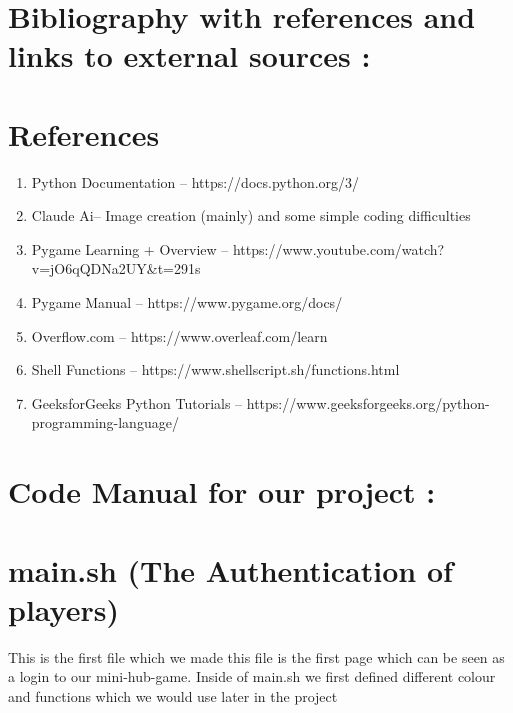 \documentclass{article}
\begin{document}
\section*{Bibliography with references and links to external sources :}
\section*{References}

\begin{enumerate}
    \item Python Documentation -- https://docs.python.org/3/
    \item Claude Ai-- Image creation (mainly) and some simple coding difficulties 
    \item Pygame Learning + Overview -- https://www.youtube.com/watch?v=jO6qQDNa2UY&t=291s
    \item Pygame Manual -- https://www.pygame.org/docs/
    \item Overflow.com -- https://www.overleaf.com/learn
    \item Shell Functions -- https://www.shellscript.sh/functions.html
    \item GeeksforGeeks Python Tutorials -- https://www.geeksforgeeks.org/python-programming-language/
\end{enumerate}

\section*{Code Manual for our project :}
\section{main.sh (The Authentication of players)}
This is the first file which we made this file is the first page which can be seen as a login to our mini-hub-game.
Inside of main.sh we first defined different colour and functions which we would use later in the project 
\end{document}
